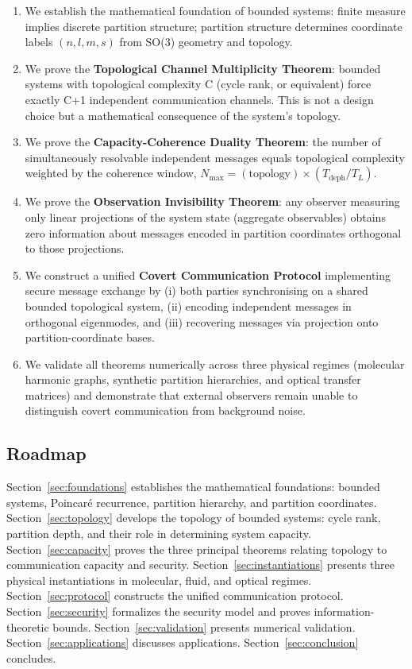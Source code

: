 \documentclass[11pt,twocolumn,a4paper]{article}
\theoremstyle{definition}
\begin{document}
\begin{enumerate}[nosep]
\item We establish the mathematical foundation of bounded systems: finite measure implies discrete partition structure; partition structure determines coordinate labels $(n,l,m,s)$ from SO(3) geometry and topology.

\item We prove the \textbf{Topological Channel Multiplicity Theorem}: bounded systems with topological complexity C (cycle rank, or equivalent) force exactly C+1 independent communication channels. This is not a design choice but a mathematical consequence of the system's topology.

\item We prove the \textbf{Capacity-Coherence Duality Theorem}: the number of simultaneously resolvable independent messages equals topological complexity weighted by the coherence window, $N_{\max} = (\text{topology}) \times (T_{\text{deph}}/T_L)$.

\item We prove the \textbf{Observation Invisibility Theorem}: any observer measuring only linear projections of the system state (aggregate observables) obtains zero information about messages encoded in partition coordinates orthogonal to those projections.

\item We construct a unified \textbf{Covert Communication Protocol} implementing secure message exchange by (i) both parties synchronising on a shared bounded topological system, (ii) encoding independent messages in orthogonal eigenmodes, and (iii) recovering messages via projection onto partition-coordinate bases.

\item We validate all theorems numerically across three physical regimes (molecular harmonic graphs, synthetic partition hierarchies, and optical transfer matrices) and demonstrate that external observers remain unable to distinguish covert communication from background noise.
\end{enumerate}

\subsection{Roadmap}

Section~\ref{sec:foundations} establishes the mathematical foundations: bounded systems, Poincaré recurrence, partition hierarchy, and partition coordinates. Section~\ref{sec:topology} develops the topology of bounded systems: cycle rank, partition depth, and their role in determining system capacity. Section~\ref{sec:capacity} proves the three principal theorems relating topology to communication capacity and security. Section~\ref{sec:instantiations} presents three physical instantiations in molecular, fluid, and optical regimes. Section~\ref{sec:protocol} constructs the unified communication protocol. Section~\ref{sec:security} formalizes the security model and proves information-theoretic bounds. Section~\ref{sec:validation} presents numerical validation. Section~\ref{sec:applications} discusses applications. Section~\ref{sec:conclusion} concludes.
\end{document}
